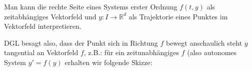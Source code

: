 \documentclass{book}
\newcommand{\tmscriptoutput}[4]{#4}
\newcommand{\tmtextbf}[1]{\text{{\bfseries{#1}}}}
\newcommand{\tmverbatim}[1]{\text{{\ttfamily{#1}}}}
\newenvironment{tmcode}[1][]{\begin{alltt} }{\end{alltt}}
\begin{document}
\begin{remark*}
  \tmtextbf{(Phasenraum)}
  
  Man kann die rechte Seite eines Systems erster Ordnung $f (t, y)$ als
  zeitabh{\"a}ngiges Vektorfeld und $y : I \rightarrow \mathbb{R}^d$ als
  Trajektorie eines Punktes im Vektorfeld interpretieren.
  
  DGL besagt also, dass der Punkt sich in Richtung $f$ bewegt \hrulefill 
  anschaulich steht $y$ tangential an Vektorfeld $f$, z.B.: f{\"u}r ein
  zeitunabh{\"a}ngiges $f$ (also autonomes System $y' = f (y)$ erhalten wir
  folgende Skizze:
  
  \tmscriptoutput{graph}{Graph}{\
  
  \begin{tmcode}
  \tmverbatim{\%pdflatex}
  \end{tmcode}
  
  \begin{tmcode}
  \tmverbatim{\textbackslash textbackslash
  documentclass\textbackslash\{standalone\textbackslash\} \ \ }
  \end{tmcode}
  
  \begin{tmcode}
  \tmverbatim{\textbackslash textbackslash
  usepackage\textbackslash\{tikz\textbackslash\} \ \ }
  \end{tmcode}
  
  \begin{tmcode}
  \tmverbatim{\textbackslash textbackslash
  usepackage\textbackslash\{amssymb\textbackslash\} \ }
  \end{tmcode}
  
  \begin{tmcode}
  \tmverbatim{\textbackslash textbackslash
  usepackage\textbackslash\{amsmath\textbackslash\}}
  \end{tmcode}
  
  \begin{tmcode}
  \tmverbatim{\textbackslash textbackslash
  usepackage\textbackslash\{quiver\textbackslash\}}
  \end{tmcode}
  
  \begin{tmcode}
  \tmverbatim{\textbackslash textbackslash
  usepackage\textbackslash\{mathrsfs\textbackslash\}}
  \end{tmcode}
  
  \begin{tmcode}
  \tmverbatim{\textbackslash textbackslash
  begin\textbackslash\{document\textbackslash\}}
  \end{tmcode}
  
}
\end{remark*}
\end{document}
